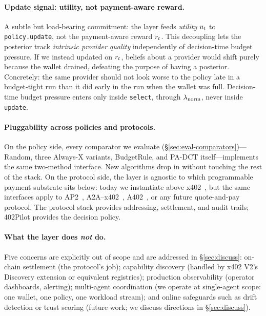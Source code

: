 \paragraph{Update signal: utility, not payment-aware reward.}
A subtle but load-bearing commitment: the layer feeds \emph{utility} $u_t$ to \texttt{policy.update}, not the payment-aware reward $r_t$. This decoupling lets the posterior track \emph{intrinsic provider quality} independently of decision-time budget pressure. If we instead updated on $r_t$, beliefs about a provider would shift purely because the wallet drained, defeating the purpose of having a posterior. Concretely: the same provider should not look worse to the policy late in a budget-tight run than it did early in the run when the wallet was full. Decision-time budget pressure enters only inside \texttt{select}, through $\lambda_{\mathrm{norm}}$, never inside \texttt{update}.

\paragraph{Pluggability across policies and protocols.}
On the policy side, every comparator we evaluate (\S\ref{sec:eval-comparators})---Random, three Always-X variants, BudgetRule, and PA-DCT itself---implements the same two-method interface. New algorithms drop in without touching the rest of the stack. On the protocol side, the layer is agnostic to which programmable payment substrate sits below: today we instantiate above x402~\citep{coinbase2025x402v2}, but the same interfaces apply to AP2~\citep{google2025ap2}, A2A--x402~\citep{a2ax402}, A402~\citep{a402}, or any future quote-and-pay protocol. The protocol stack provides addressing, settlement, and audit trails; 402Pilot provides the decision policy.

\paragraph{What the layer does \emph{not} do.}
Five concerns are explicitly out of scope and are addressed in \S\ref{sec:discuss}:
on-chain settlement (the protocol's job);
capability discovery (handled by x402 V2's Discovery extension or equivalent registries);
production observability (operator dashboards, alerting);
multi-agent coordination (we operate at single-agent scope: one wallet, one policy, one workload stream);
and online safeguards such as drift detection or trust scoring (future work; we discuss directions in \S\ref{sec:discuss}).

